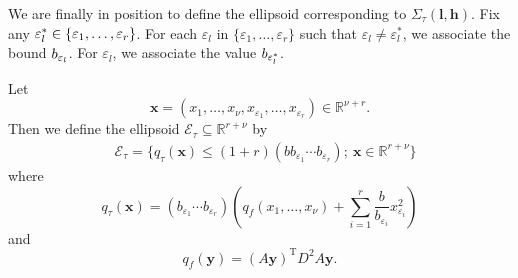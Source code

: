 We are finally in position to define the ellipsoid corresponding to $\Sigma_{\tau}(\mathbf{l}, \mathbf{h})$. Fix any $\varepsilon_l^* \in \{\varepsilon_1, \dots, \varepsilon_r\}$. 
For each $\varepsilon_l$ in $\{\varepsilon_1, \dots, \varepsilon_r\}$ such that $\varepsilon_l \neq \varepsilon_l^*$, we associate the bound $b_{\varepsilon_l}$. For $\varepsilon_l$, we associate the value $b_{\varepsilon_l^*}$.
%

Let
\[\mathbf{x} = (x_1, \dots, x_{\nu}, x_{\varepsilon_1}, \dots, x_{\varepsilon_{r}}) \in \mathbb{R}^{\nu + r}.\]
Then we define the ellipsoid $\mathcal{E_\tau}\subseteq \mathbb{R}^{r+\nu}$ by
\begin{align}\label{def:ellreal}
& \mathcal{E_\tau}=\{q_\tau(\mathbf{x})\leq (1 + r)(bb_{\varepsilon_1}\cdots b_{\varepsilon_r}); \ \mathbf{x}\in\mathbb{R}^{r+\nu}\}\end{align}
where
\[q_{\tau}(\mathbf{x})= (b_{\varepsilon_1}\cdots b_{\varepsilon_r})\left( q_f(x_1, \dots, x_{\nu}) + \sum_{i = 1}^r\frac{b}{b_{\varepsilon_i}}x_{\varepsilon_i}^2\right)\]
and
\[q_f(\mathbf{y}) = (A\mathbf{y})^{\text{T}}D^2A\mathbf{y}.\]

